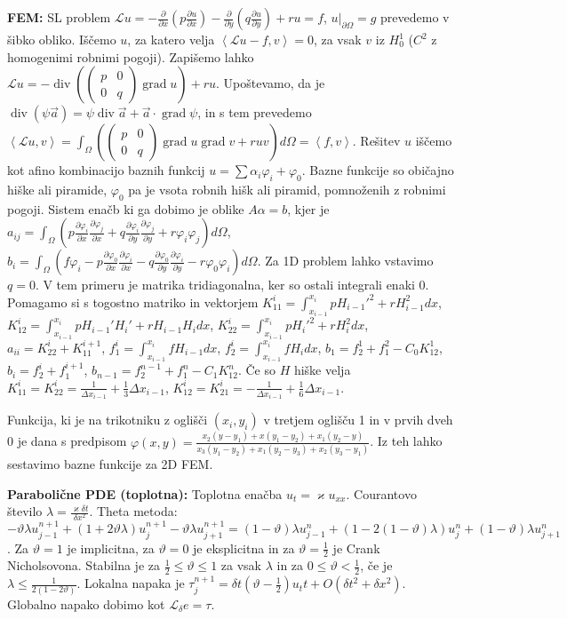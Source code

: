 \documentclass[a4paper,12pt]{article}
\theoremstyle{definition}
\renewcommand{\phi}{\varphi}
\renewcommand{\theta}{\vartheta}
\newcommand{\grad}{\operatorname{grad}}
\renewcommand{\div}{\operatorname{div}}
\newcommand{\dpar}[2]{\ensuremath{\frac{\partial #1}{\partial #2}}}
\newcommand{\dpx}[1]{\dpar{#1}{x}}
\newcommand{\dpy}[1]{\dpar{#1}{y}}
\newcommand{\ls}{\left\langle}
\newcommand{\rs}{\right\rangle}
\renewcommand{\L}{\mathcal{L}}
\newcommand{\dx}{\delta x}
\newcommand{\dt}{\delta t}
\begin{document}
\textbf{FEM:}
SL problem $\L u = -\dpx{}\left(p\dpx{u}\right) - \dpy{}\left(q\dpy{u}\right) + ru = f$,
$u|_{\partial \Omega} = g$ prevedemo v šibko obliko. Iščemo $u$, za katero velja
$\ls \L u - f, v\rs = 0$, za vsak $v$ iz $H_0^1$ ($C^2$ z homogenimi robnimi pogoji).
Zapišemo lahko $\L u = -\div\left(\left(
\begin{smallmatrix} p & 0 \\ 0 & q \end{smallmatrix} \right) \grad u\right) + ru$.
Upoštevamo, da je $\div(\psi \vec{a}) = \psi \div\vec{a} + \vec{a}\cdot \grad{\psi}$, in s tem prevedemo
$\ls \L u, v\rs = \int_\Omega (\left(\begin{smallmatrix} p & 0 \\ 0 & q \end{smallmatrix} \right)\grad u \grad v + ruv) d\Omega = \ls f, v\rs$.
Rešitev $u$ iščemo kot afino kombinacijo baznih funkcij $u = \sum \alpha_i \phi_i + \phi_0$. Bazne funkcije so običajno hiške ali piramide, $\phi_0$ pa je vsota robnih hišk ali piramid, pomnoženih z robnimi pogoji.
Sistem enačb ki ga dobimo je oblike $A \alpha = b$, kjer je
$a_{ij} = \int_\Omega (p\dpx{\phi_i}\dpx{\phi_j} + q\dpy{\phi_i}\dpy{\phi_j} + r\phi_i\phi_j)d\Omega$, $b_i = \int_\Omega (f\phi_i - p\dpx{\phi_0}\dpx{\phi_i} - q\dpy{\phi_0}\dpy{\phi_i}-r\phi_0\phi_i)d\Omega$.
Za 1D problem lahko vstavimo $q= 0$. V tem primeru je matrika tridiagonalna, ker so ostali integrali enaki 0.
Pomagamo si s togostno matriko in vektorjem
$K^i_{11} = \int_{x_{i-1}}^{x_i} p H_{i-1}'^2+rH_{i-1}^2dx$,
$K^i_{12} = \int_{x_{i-1}}^{x_i} p H_{i-1}'H_{i}'+rH_{i-1}H_idx$,
$K^i_{22} = \int_{x_{i-1}}^{x_i} p H_{i}'^2+rH_{i}^2dx$,
$a_{ii} = K_{22}^i + K_{11}^{i+1}$,
$f_1^i = \int_{x_{i-1}}^{x_i}fH_{i-1}dx$,
$f_2^i = \int_{x_{i-1}}^{x_i}fH_{i}dx$,
$b_1 = f_2^1 + f_1^2 - C_0K_{12}^1$,
$b_i = f^i_2 + f_1^{i+1}$,
$b_{n-1} = f_2^{n-1} + f_1^n - C_1K_{12}^n$.
Če so $H$ hiške velja $K_{11}^i = K_{22}^i = \frac{1}{\Delta x_{i-1}} + \frac13\Delta x_{i-1}$, $K^i_{12} = K^i_{21} = -\frac{1}{\Delta x_{i-1}} + \frac16\Delta x_{i-1}$.

Funkcija, ki je na trikotniku z oglišči $(x_i, y_i)$ v tretjem oglišču 1 in v prvih dveh 0 je dana s predpisom
$\phi(x, y) = \frac{x_2 \left(y-y_1\right)+x \left(y_1-y_2\right)+x_1 \left(y_2-y\right)}{x_3 \left(y_1-y_2\right)+x_1 \left(y_2-y_3\right)+x_2 \left(y_3-y_1\right)}$. Iz teh lahko sestavimo bazne funkcije za 2D FEM.

\textbf{Parabolične PDE (toplotna):}
Toplotna enačba $u_t = \varkappa u_{xx}$. Courantovo število $\lambda = \frac{\varkappa \dt}{\dx^2}$.
Theta metoda:
$-\theta\lambda u_{j-1}^{n+1} +
(1+2\theta\lambda)u_j^{n+1} -
\theta\lambda u_{j+1}^{n+1} =
(1-\theta)\lambda u_{j-1}^n +
(1- 2(1-\theta)\lambda) u_j^n +
(1-\theta)\lambda u_{j+1}^n$.
Za $\theta = 1$ je implicitna, za $\theta = 0$ je eksplicitna in za $\theta = \frac12$ je Crank Nicholsovona.
Stabilna je za $\frac12 \leq \theta \leq 1$ za vsak $\lambda$ in za
$0 \leq \theta < \frac12$, če je $\lambda \leq \frac{1}{2(1-2\theta)}$.
Lokalna napaka je $\tau_j^{n+1} = \dt(\theta-\frac12)u_tt + O(\dt^2+\dx^2)$.
Globalno napako dobimo kot $\L_\delta e = \tau$.
\end{document}
